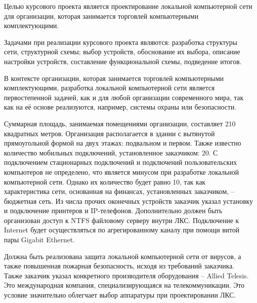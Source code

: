\label{sec:intro}


Целью курсового проекта является проектирование локальной компьютерной сети для организации, которая занимается торговлей компьютерными комплектующими.

Задачами при реализации курсового проекта являются:
разработка структуры сети,
структурной схемы;
выбор устройств,
обоснование их выбора,
описание настройки устройств,
составление функциональной схемы,
подведение итогов.

В контексте организации, которая занимается торговлей компьютерными комплектующими, разработка локальной компьютерной сети является первостепенной задачей, как и для любой организации современного мира, так как на её основе реализуются, например, системы охраны или безопасности.

Суммарная площадь, занимаемая помещениями организации, составляет 210 квадратных метров.
Организация располагается в здании с вытянутой прямоугольной формой на двух этажах: подвальном и первом.
Также известно количество мобильных подключений, установленное заказчиком: 20.
С подключением стационарных подключений и подключений пользовательских компьютеров не определено, что является минусом при разработке локальной компьютерной сети.
Однако их количество будет равно 10, так как характеристика сети, основанная на финансах, установленных заказчиком, – бюджетная сеть.
Из числа прочих оконечных устройств заказчик указал установку и подключение принтеров и IP-телефонов.
Дополнительно должен быть организован доступ к NTFS файловому серверу внутри ЛКС.
Подключение к Internet будет осуществляться по агрегированному каналу при помощи витой пары Gigabit Ethernet.

Должна быть реализована защита локальной компьютерной сети от вирусов,
а также повышенная пожарная безопасность, исходя из требований заказчика.
Также заказчик указал конкретного производителя оборудования – Allied Telesis.
Это международная компания, специализирующаяся на телекоммуникации.
Это условие значительно облегчает выбор аппаратуры при проектировании ЛКС.

\newpage

